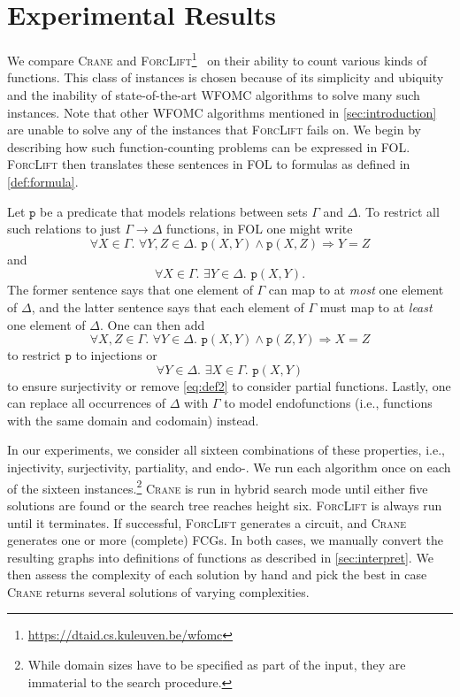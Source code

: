 \documentclass{article}
\theoremstyle{definition}
\begin{document}
\section{Experimental Results}\label{sec:results}

We compare \textsc{Crane} and
\textsc{ForcLift}\footnote{\url{https://dtaid.cs.kuleuven.be/wfomc}}~\cite{DBLP:conf/ijcai/BroeckTMDR11}
on their ability to count various kinds of functions. This class of instances is
chosen because of its simplicity and ubiquity and the inability of
state-of-the-art WFOMC algorithms to solve many such instances. Note that other
WFOMC algorithms mentioned in \cref{sec:introduction} are unable to solve any of
the instances that \textsc{ForcLift} fails on. We begin by describing how such
function-counting problems can be expressed in FOL\@. \textsc{ForcLift} then
translates these sentences in FOL to formulas as defined in \cref{def:formula}.

Let $\texttt{p}$ be a predicate that models relations between sets $\Gamma$ and
$\Delta$. To restrict all such relations to just $\Gamma \to \Delta$ functions,
in FOL one might write
\[
  \forall X \in \Gamma\text{. }\forall Y,Z \in \Delta\text{. }\texttt{p}(X, Y) \land \texttt{p}(X, Z) \Rightarrow Y = Z
\]
and
\begin{equation}\label{eq:def2}
  \forall X \in \Gamma\text{. }\exists Y \in \Delta\text{. }\texttt{p}(X, Y).
\end{equation}
The former sentence says that one element of $\Gamma$ can map to at \emph{most}
one element of $\Delta$, and the latter sentence says that each element of
$\Gamma$ must map to at \emph{least} one element of $\Delta$. One can then add
\[
  \forall X,Z \in \Gamma\text{. }\forall Y \in \Delta\text{. }\texttt{p}(X, Y) \land \texttt{p}(Z, Y) \Rightarrow X = Z
\]
to restrict $\texttt{p}$ to injections or
\[
  \forall Y \in \Delta\text{. }\exists X \in \Gamma\text{. }\texttt{p}(X, Y)
\]
to ensure surjectivity or remove \cref{eq:def2} to consider partial functions.
Lastly, one can replace all occurrences of $\Delta$ with $\Gamma$ to model
endofunctions (i.e., functions with the same domain and codomain) instead.

In our experiments, we consider all sixteen combinations of these properties,
i.e., injectivity, surjectivity, partiality, and endo-. We run each algorithm
once on each of the sixteen instances.\footnote{While domain sizes have to be
  specified as part of the input, they are immaterial to the search procedure.}
\textsc{Crane} is run in hybrid search mode until either five solutions are
found or the search tree reaches height six. \textsc{ForcLift} is always run
until it terminates. If successful, \textsc{ForcLift} generates a circuit, and
\textsc{Crane} generates one or more (complete) FCGs. In both cases, we manually
convert the resulting graphs into definitions of functions as described in
\cref{sec:interpret}. We then assess the complexity of each solution by hand and
pick the best in case \textsc{Crane} returns several solutions of varying
complexities.
\end{document}
